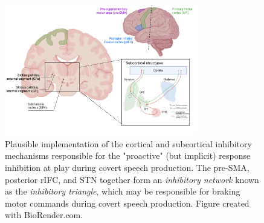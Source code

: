\documentclass[utf8]{template/frontiersSCNS} %
\begin{document}
\begin{figure}[ht] %
\begin{center}
\includegraphics[width=0.75\textwidth]{figures/inhibitory_triangle.png} %
\end{center}
\caption{Plausible implementation of the cortical and subcortical inhibitory mechanisms responsible for the "proactive" (but implicit) response inhibition at play during covert speech production. The pre-SMA, posterior rIFC, and STN together form an \textit{inhibitory network} known as the \textit{inhibitory triangle}, which may be responsible for braking motor commands during covert speech production. Figure created with BioRender.com.}\label{triangle}
\end{figure}

\end{document}
